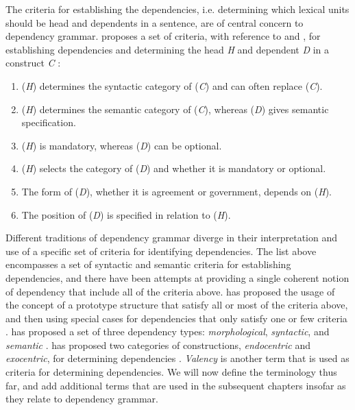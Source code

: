 The criteria for establishing the dependencies, i.e. determining which lexical units should be head and dependents in a sentence, are of central concern to dependency grammar. \citeauthor{Niv:05} proposes a set of criteria, with reference to \citeauthor{Zwicky:85} and \citeauthor{Hudson:90}, for establishing dependencies and determining the head \textit{H} and dependent \textit{D} in a construct \textit{C} \cite{Zwicky:85, Hudson:90, Niv:05}:

\begin{enumerate}
\item (\textit{H}) determines the syntactic category of (\textit{C}) and can often replace (\textit{C}).
\item (\textit{H}) determines the semantic category of (\textit{C}), whereas (\textit{D}) gives semantic specification.
\item (\textit{H}) is mandatory, whereas (\textit{D}) can be optional.
\item (\textit{H}) selects the category of (\textit{D}) and whether it is mandatory or optional.
\item The form of (\textit{D}), whether it is agreement or government, depends on (\textit{H}).
\item The position of (\textit{D}) is specified in relation to (\textit{H}).
\end{enumerate}

Different traditions of dependency grammar diverge in their interpretation and use of a specific set of criteria for identifying dependencies. The list above encompasses a set of syntactic and semantic criteria for establishing dependencies, and there have been attempts at providing a single coherent notion of dependency that include all of the criteria above. \citeauthor{Hudson:90} has proposed the usage of the concept of a prototype structure that satisfy all or most of the criteria above, and then using special cases for dependencies that only satisfy one or few criteria \cite{Hudson:90}. \citeauthor{Mel:88} has proposed a set of three dependency types: \textit{morphological}, \textit{syntactic}, and \textit{semantic} \cite{Mel:88}. \citeauthor{Nikula:86} has proposed two categories of constructions, \textit{endocentric} and \textit{exocentric}, for determining dependencies \cite{Nikula:86}. \textit{Valency} is another term that is used as criteria for determining dependencies. We will now define the terminology thus far, and add additional terms that are used in the subsequent chapters insofar as they relate to dependency grammar.

